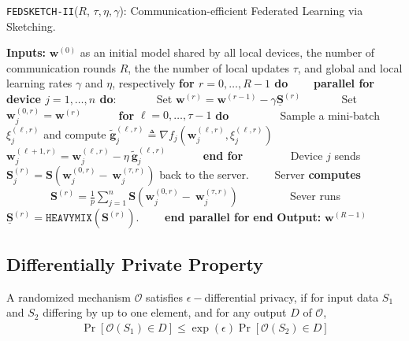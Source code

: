 \begin{algorithm}[H]
\caption{\texttt{FEDSKETCH-II}($R$, $\tau, \eta, \gamma$): Communication-efficient Federated Learning via Sketching. }\label{Alg:ce-h}
\begin{algorithmic}[1]
\State \textbf{Inputs:} $\boldsymbol{w}^{(0)}$ as an initial  model shared by all local devices, the number of communication rounds $R$, the the number of local updates $\tau$, and global and local learning rates $\gamma$ and $\eta$, respectively
\State \textbf{for $r=0, \ldots, R-1$ do}
\State $\qquad$\textbf{parallel for device $j=1,\ldots,n$ do}:
\State $\qquad\quad$ Set $\boldsymbol{w}^{(r)}=\boldsymbol{w}^{(r-1)}-\gamma\underline{\mathbf{S}}^{(r)}$
\State $\qquad\quad$ Set $\boldsymbol{w}_j^{(0,r)}=\boldsymbol{w}^{(r)}$ 
\State $\qquad\quad $\textbf{for} $\ell=0,\ldots,\tau-1$ \textbf{do}
\State $\qquad\quad\quad$ Sample a mini-batch $\xi_j^{(\ell,r)}$ and compute $\tilde{\mathbf{g}}_{j}^{(\ell,r)}\triangleq\nabla{f}_j(\boldsymbol{w}^{(\ell,r)}_j,\xi_j^{(\ell,r)})$
\State $\qquad\quad\quad$ $\boldsymbol{w}^{(\ell+1,r)}_{j}=\boldsymbol{w}^{(\ell,r)}_j-\eta~ \tilde{\mathbf{g}}_{j}^{(\ell,r)}$ \label{eq:update-rule-alg}
\State $\qquad\quad$\textbf{end for}
\State $\qquad\quad\quad$Device $j$ sends $\mathbf{S}_j^{(r)}=\mathbf{S}\left(\boldsymbol{w}_j^{(0,r)}-~{\boldsymbol{w}}_{j}^{(\tau,r)}\right)$ back to the server.
\State $\qquad$Server \textbf{computes} 
\State $\qquad\qquad {\mathbf{S}}^{(r)}=\frac{1}{p}\sum_{j=1}^n\mathbf{S}\left(\boldsymbol{w}_j^{(0,r)}-~{\boldsymbol{w}}_{j}^{(\tau,r)}\right)$ %
\State $\qquad\qquad$ Sever runs $\underline{\mathbf{S}}^{(r)}= \texttt{HEAVYMIX}(\mathbf{S}^{(r)})$.
\State $\qquad$\textbf{end parallel for}
\State \textbf{end}
\State \textbf{Output:} ${\boldsymbol{w}}^{(R-1)}$
\vspace{- 0.1cm}
\end{algorithmic}
\end{algorithm}




\subsection{Differentially Private Property}
\begin{definition}
A randomized mechanism $\mathcal{O}$ satisfies $\epsilon-$differential privacy, if for input data ${S}_1$ and ${S}_2$ differing by up to one element, and for any output $D$ of $\mathcal{O}$,
\begin{align}
    \Pr\left[\mathcal{O}(S_1)\in D\right]\leq \exp{\left(\epsilon\right)}\Pr\left[\mathcal{O}(S_2)\in D\right] 
\end{align}
\end{definition}

